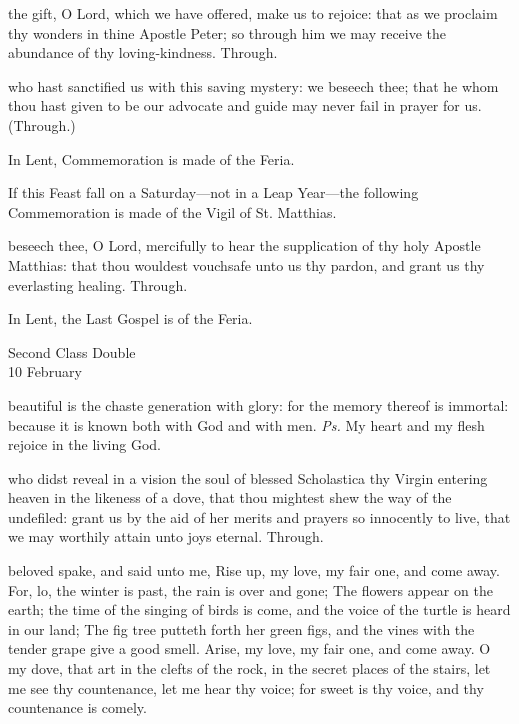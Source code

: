 
\postcommunion
{} the gift, O Lord, which we have offered, make us to rejoice: that as we proclaim thy wonders in thine Apostle Peter; so through him we may receive the abundance of thy loving-kindness. Through.

 who hast sanctified us with this saving mystery: we beseech thee; that he whom thou hast given to be our advocate and guide may never fail in prayer for us. (Through.)
\begin{rubric}
    In Lent, Commemoration is made of the Feria.%
\end{rubric}
\begin{rubric}
    If this Feast fall on a Saturday---not in a Leap Year---the following Commemoration is made of the Vigil of St. Matthias.
\end{rubric}
 beseech thee, O Lord, mercifully to hear the supplication of thy holy Apostle Matthias: that thou wouldest vouchsafe unto us thy pardon, and grant us thy everlasting healing. Through.
\begin{rubric}
    In Lent, the Last Gospel is of the Feria.
\end{rubric}


\begin{inhead}
    {Second Class Double\\
10 February}
\end{inhead}


\introit
{} beautiful is the chaste generation with glory: for the memory thereof is immortal: because it is known both with God and with men. \textit{Ps.} My heart and my flesh rejoice in the living God.

\collect
{} who didst reveal in a vision the soul of blessed Scholastica thy Virgin entering heaven in the likeness of a dove, that thou mightest shew the way of the undefiled: grant us by the aid of her merits and prayers so innocently to live, that we may worthily attain unto joys eternal. Through.

 beloved spake, and said unto me, Rise up, my love, my fair one, and come away. For, lo, the winter is past, the rain is over and gone; The flowers appear on the earth; the time of the singing of birds is come, and the voice of the turtle is heard in our land; The fig tree putteth forth her green figs, and the vines with the tender grape give a good smell. Arise, my love, my fair one, and come away. O my dove, that art in the clefts of the rock, in the secret places of the stairs, let me see thy countenance, let me hear thy voice; for sweet is thy voice, and thy countenance is comely.

